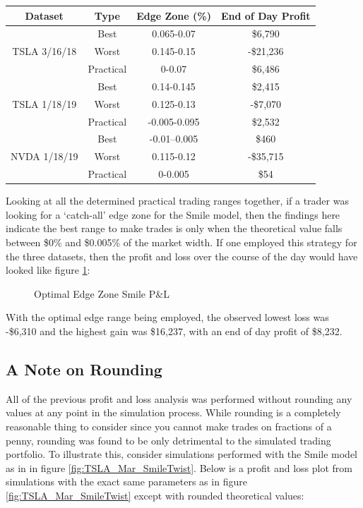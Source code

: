 \documentclass[12pt, a4paper, notitlepage]{article}
\numberwithin{equation}{subsection}
\numberwithin{figure}{subsection}
\numberwithin{table}{subsection}
\newcommand{\img}[3]
{
    \begin{figure}[H]
	\caption{#1}
	\centerline{\fbox{\texttt{[image: \#2]}}}
	\label{#3}
    \end{figure}
}
\begin{document}
\begin{center}
    \captionsetup{hypcap=false}
    \label{tab:TwistBestAndWorstEdgeZones}
    \begin{tabular}{ |c|c|c|c| }
        \hline \rowcolor{LightGreen}
        \textbf{Dataset} & \textbf{Type}  & \textbf{Edge Zone (\%)} & \textbf{End of Day Profit} \\ \hline
        \multirow{3}{*}{TSLA 3/16/18}
        &   Best       &  0.065-0.07   &   \$6,790      \\
        &   Worst      &  0.145-0.15   &   -\$21,236    \\
        &   Practical  &  0-0.07       &   \$6,486      \\ \hline
        \multirow{3}{*}{TSLA 1/18/19}
        &   Best       &  0.14-0.145   &   \$2,415      \\
        &   Worst      &  0.125-0.13   &   -\$7,070     \\
        &   Practical  &  -0.005-0.095 &   \$2,532      \\ \hline
        \multirow{3}{*}{NVDA 1/18/19}
        &   Best       &  -0.01--0.005 &   \$460        \\
        &   Worst      &  0.115-0.12   &   -\$35,715    \\
        &   Practical  &  0-0.005      &   \$54         \\ \hline
    \end{tabular}
\end{center}

Looking at all the determined practical trading ranges together, if a trader was looking for a `catch-all' edge zone for the Smile model, then the findings here indicate the best range to make trades is only when the theoretical value falls between \$0\% and \$0.005\% of the market width.  If one employed this strategy for the three datasets, then the profit and loss over the course of the day would have looked like figure \ref{fig:SmileOptimalPnL}:

\img{Optimal Edge Zone Smile P\&L}{SmileOptimalPnL}{fig:SmileOptimalPnL}

With the optimal edge range being employed, the observed lowest loss was -\$6,310 and the highest gain was \$16,237, with an end of day profit of \$8,232.

\subsection{A Note on Rounding}
All of the previous profit and loss analysis was performed without rounding any values at any point in the simulation process.  While rounding is a completely reasonable thing to consider since you cannot make trades on fractions of a penny, rounding was found to be only detrimental to the simulated trading portfolio.  To illustrate this, consider simulations performed with the Smile model as in in figure \ref{fig:TSLA_Mar_SmileTwist}.  Below is a profit and loss plot from simulations with the exact same parameters as in figure \ref{fig:TSLA_Mar_SmileTwist} except with rounded theoretical values:
\end{document}

